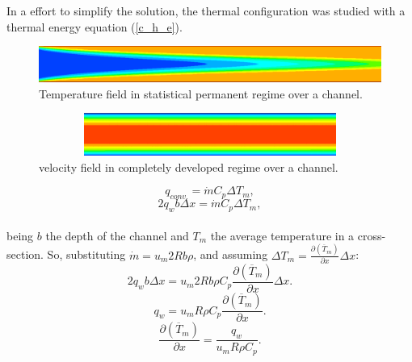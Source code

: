 \documentclass[10pt]{article} %
\begin{document}
In a effort to simplify the solution, the thermal configuration was studied with a thermal energy equation (\ref{c_h_e}).
\begin{figure}[h!]
	\centering
	\includegraphics[angle=0, scale=0.40]{fotos_formatacao_final/temperatura}
	\caption{Temperature field in statistical permanent regime over a channel.}
	\label{figure.2}
\end{figure}
\begin{figure}[h!]
	\centering
	\includegraphics[angle=0, height=1.4cm , width=12.3cm]{fotos_formatacao_final/velocidade}
	\caption{velocity field in completely developed regime over a channel.}
	\label{figure.3}
\end{figure}


\begin{equation}\label{c_h_e}
q_{conv.} = \dot{m} C_p \Delta T_m,
\end{equation}
\begin{equation}
2q_w b \Delta x = \dot{m} C_p \Delta T_m,
\end{equation}\\



being $b$ the depth of the channel and $T_m$ the average temperature in a cross-section. So, substituting $ \dot{m} = u_m 2R b \rho $, and assuming $ \Delta T_m = \frac{\partial{\left(\overline{T}_m\right)}}{\partial{x}} \Delta x $:
\begin{equation}
2q_w b \Delta x = u_m 2R b \rho  C_p \frac{\partial{\left(\overline{T}_m\right)}}{\partial{x}} \Delta x.
\end{equation}     
\begin{equation}
q_w = u_m R \rho  C_p \frac{\partial{\left(\overline{T}_m\right)}}{\partial{x}} .
\end{equation} 
\begin{equation}\label{c_h_ee}
\frac{\partial{\left(\overline{T}_m\right)}}{\partial{x}} = \frac{q_w}{u_m  R \rho  C_p } .
\end{equation} 
\end{document}
